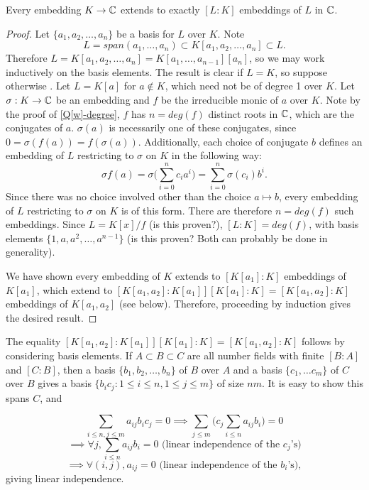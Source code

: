 \begin{proposition}
Every embedding $K\rightarrow \mathbb{C}$ extends to exactly $[L:K]$ embeddings of $L$ in $\mathbb{C}$.
\end{proposition}
\begin{proof}
Let $\{a_1,a_2,\dots,a_n\}$ be a basis for $L$ over $K$. Note $$L=span(a_1,\dots,a_n)\subset K[a_1,a_2,\dots,a_n]\subset L.$$ Therefore $L= K[a_1,a_2,\dots,a_n]=K[a_1,\dots,a_{n-1}][a_n]$, so we may work inductively on the basis elements. The result is clear if $L=K$, so suppose otherwise . Let $L=K[a]$ for $a\not\in K$, which need not be of degree 1 over $K$. Let $\sigma:K\rightarrow \mathbb{C}$ be an embedding
and $f$ be the irreducible monic of $a$ over $K$. Note by the proof of \cref{Q[w]-degree}, $f$ has $n=deg(f)$ distinct roots in $\mathbb{C}$, which are the conjugates of $a.$ $\sigma(a)$ is necessarily one of these conjugates, since $0=\sigma(f(a))=f(\sigma(a)).$ Additionally, each choice of conjugate $b$ defines an embedding of $L$ restricting to $\sigma$ on $K$ in the following way:
$$\sigma f(a)=\sigma \big(\sum_{i=0}^n c_ia^i\big)=\sum_{i=0}^n \sigma(c_i) b^i.$$
Since there was no choice involved other than the choice $a\mapsto b$, every embedding of $L$ restricting to $\sigma$ on $K$ is of this form. There are therefore $n=deg(f)$ such embeddings. Since $L=K[x]/f$ (is this proven?), $[L:K]=deg(f)$, with basis elements $\{1,a,a^2,\dots, a^{n-1}\}$ (is this proven? Both can probably be done in generality).

We have shown every embedding of $K$ extends to $[K[a_1]:K]$ embeddings of $K[a_1]$, which extend to $[K[a_1,a_2]:K[a_1]][K[a_1]:K]=[K[a_1,a_2]:K]$ embeddings of $K[a_1,a_2]$ (see below). Therefore, proceeding by induction gives the desired result.
\end{proof}

The equality $[K[a_1,a_2]:K[a_1]][K[a_1]:K]=[K[a_1,a_2]:K]$ follows by considering basis elements. If $A\subset B\subset C$ are all number fields with finite $[B:A]$ and $[C:B]$, then a basis $\{b_1,b_2,\dots,b_n\}$ of $B$ over $A$ and a basis $\{c_1,\dots c_m\}$ of $C$ over $B$ gives a basis $\{b_ic_j:1\leq i \leq n, 1 \leq j\leq m\}$ of size $nm$. It is easy to show this spans $C$, and 

$$\sum_{i\leq n,j\leq m}a_{ij}b_ic_j=0\implies \sum_{j\leq m} \big(c_j \sum_{i\leq n}a_{ij}b_i\big)=0$$
$$\implies \forall j, \sum_{i\leq n} a_{ij}b_i=0 \text{ (linear independence of the } c_j \text{'s)}$$
$$\implies \forall (i,j), a_{ij}=0 \text{ (linear independence of the } b_i \text{'s)},$$
giving linear independence.

